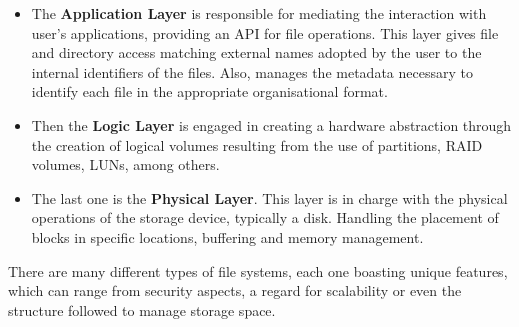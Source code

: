 \begin{itemize}
	\item The \textbf{Application Layer} is responsible for mediating the interaction with user's applications, providing an API for file operations. This layer gives file and directory access matching external names adopted by the user to the internal identifiers of the files. Also, manages the metadata necessary to identify each file in the appropriate organisational format.
	\item Then the \textbf{Logic Layer} is engaged in creating a hardware abstraction through the creation of logical volumes resulting from the use of partitions, RAID volumes, LUNs, among others.
	\item The last one is the \textbf{Physical Layer}. This layer is in charge with the physical operations of the storage device, typically a disk. Handling the placement of blocks in specific locations, buffering and memory management.
\end{itemize}


There are many different types of file systems, each one boasting unique features, which can range from security aspects, a regard for scalability or even the structure followed to manage storage space.

